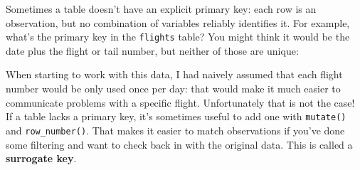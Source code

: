 \documentclass[]{book}
\newenvironment{Shaded}{\begin{snugshade}}{\end{snugshade}}
\newcommand{\KeywordTok}[1]{\textcolor[rgb]{0.13,0.29,0.53}{\textbf{{#1}}}}
\newcommand{\DecValTok}[1]{\textcolor[rgb]{0.00,0.00,0.81}{{#1}}}
\newcommand{\StringTok}[1]{\textcolor[rgb]{0.31,0.60,0.02}{{#1}}}
\newcommand{\CommentTok}[1]{\textcolor[rgb]{0.56,0.35,0.01}{\textit{{#1}}}}
\newcommand{\NormalTok}[1]{{#1}}
\begin{document}
Sometimes a table doesn't have an explicit primary key: each row is an
observation, but no combination of variables reliably identifies it. For
example, what's the primary key in the \texttt{flights} table? You might
think it would be the date plus the flight or tail number, but neither
of those are unique:

\begin{Shaded}
\end{Shaded}

When starting to work with this data, I had naively assumed that each
flight number would be only used once per day: that would make it much
easier to communicate problems with a specific flight. Unfortunately
that is not the case! If a table lacks a primary key, it's sometimes
useful to add one with \texttt{mutate()} and \texttt{row\_number()}.
That makes it easier to match observations if you've done some filtering
and want to check back in with the original data. This is called a
\textbf{surrogate key}.
\end{document}
